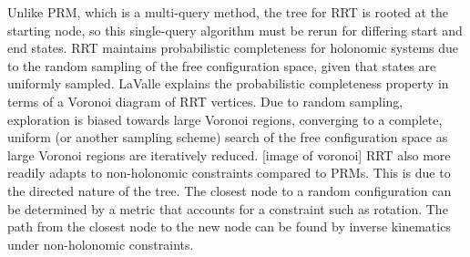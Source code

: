 \documentclass[12pt]{article}
\begin{document}
            \par Unlike PRM, which is a multi-query method, the tree for RRT is rooted at the starting node, so this single-query algorithm must be rerun for differing start and end states. RRT maintains probabilistic completeness for holonomic systems due to the random sampling of the free configuration space, given that states are uniformly sampled. LaValle explains the probabilistic completeness property in terms of a Voronoi diagram of RRT vertices. Due to random sampling, exploration is biased towards large Voronoi regions, converging to a complete, uniform (or another sampling scheme) search of the free configuration space as large Voronoi regions are iteratively reduced. [image of voronoi] RRT also more readily adapts to non-holonomic constraints compared to PRMs. This is due to the directed nature of the tree. The closest node to a random configuration can be determined by a metric that accounts for a constraint such as rotation. The path from the closest node to the new node can be found by inverse kinematics under non-holonomic constraints.
\end{document}
